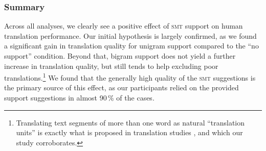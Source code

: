 \documentclass[output=paper]{LSP/langsci}
\begin{document}


 
\subsubsection{Summary}

Across all analyses, we clearly see a positive effect of \textsc{smt}
support on human translation performance. Our initial hypothesis is
largely confirmed, as we found a significant gain in translation
quality for unigram support compared to the ``no support''
condition. Beyond that, bigram support does not yield a further
increase in translation quality, but still tends to help excluding poor
translations.\footnote{Translating text segments of more than one word
  as natural ``translation units'' is exactly what is proposed in
  translation studies \citep[see, \eg,][]{Toury}, and which our study
  corroborates.} %
We found that the generally high quality of the \textsc{smt}
suggestions is the primary source of this effect, as our participants
relied on the provided support suggestions in almost 90\,\% of the
cases.
\end{document}

